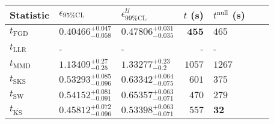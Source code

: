 \begin{tabular}{l|llr|llr}
	Statistic & $\epsilon_{95\%\mathrm{CL}}$ & $\epsilon^    {\mathcal{U}}_{99\%\mathrm{CL}}$ & $t$ (s) & $t^{\mathrm{null}}$ (s) \\
	\midrule
	$t_{\mathrm{FGD}}$ & ${\mathbf{0.40466_{-0.058}^{+0.047}}}$ & ${\mathbf{0.47806_{-0.035}^{+0.031}}}$ & ${\mathbf{455}}$ & $465$ \\
	$t_{\mathrm{LLR}}$ & - & - & - & - \\
	$t_{\mathrm{MMD}}$ & $1.13409_{-0.25}^{+0.27}$ & $1.33277_{-0.2}^{+0.23}$ & $1057$ & $1267$ \\
	$t_{\mathrm{SKS}}$ & $0.53293_{-0.096}^{+0.085}$ & $0.63342_{-0.075}^{+0.064}$ & $601$ & $375$ \\
	$t_{\mathrm{SW}}$ & $0.54152_{-0.091}^{+0.081}$ & $0.65357_{-0.071}^{+0.063}$ & $470$ & $279$ \\
	$t_{\overline{\mathrm{KS}}}$ & $0.45812_{-0.096}^{+0.072}$ & $0.53398_{-0.071}^{+0.063}$ & $557$ & ${\mathbf{32}}$ \\
	\bottomrule
\end{tabular}